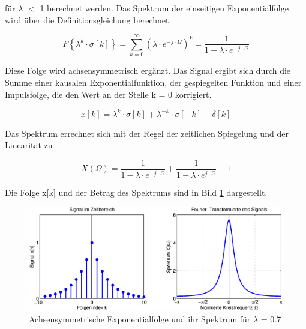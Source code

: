 f\"{u}r {\textbar}$\lambda${\textbar} $\mathrm{<}$ 1 berechnet werden. Das Spektrum der einseitigen Exponentialfolge wird \"{u}ber die Definitionsgleichung berechnet.

\begin{equation}\label{eq:sevensixtyfour}
F\left\{\lambda ^{k} \cdot \sigma \left[k\right]\right\}=\sum _{k=0}^{\infty }\left(\lambda \cdot e^{-j\cdot \Omega } \right)^{k}  =\frac{1}{1-\lambda \cdot e^{-j\cdot \Omega }}
\end{equation}

\noindent Diese Folge wird achsensymmetrisch erg\"{a}nzt. Das Signal ergibt sich durch die Summe einer kausalen Exponentialfunktion, der gespiegelten Funktion und einer Impulsfolge, die den Wert an der Stelle k = 0 korrigiert.

\begin{equation}\label{eq:sevensixtyfive}
x\left[k\right]=\lambda ^{k} \cdot \sigma \left[k\right]+\lambda ^{-k} \cdot \sigma \left[-k\right]-\delta \left[k\right]
\end{equation}

\noindent Das Spektrum errechnet sich mit der Regel der zeitlichen Spiegelung und der Linearit\"{a}t zu

\begin{equation}\label{eq:sevensixtysix}
X\left(\Omega \right)=\frac{1}{1-\lambda \cdot e^{-j\cdot \Omega } } +\frac{1}{1-\lambda \cdot e^{j\cdot \Omega } } -1
\end{equation}

Die Folge x[k] und der Betrag des Spektrums sind in Bild \ref{fig:FourierZeitinvertierung} dargestellt.

\begin{figure}[H]
  \centerline{\includegraphics[width=1\textwidth]{Kapitel7/Bilder/image10.eps}}
  \caption{Achsensymmetrische Exponentialfolge und ihr Spektrum für $\lambda$ = 0.7}
  \label{fig:FourierZeitinvertierung}
\end{figure}

